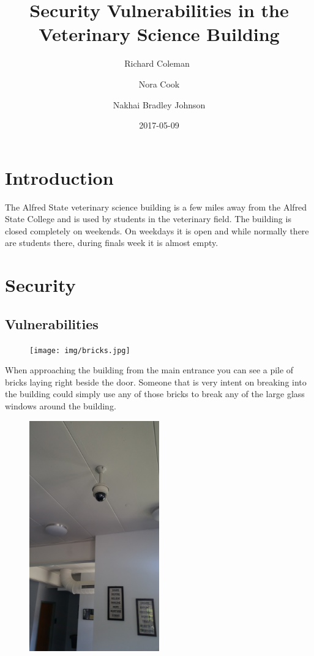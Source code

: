 \documentclass[12pt]{article}
\title{Security Vulnerabilities in the Veterinary Science Building}
\date{2017-05-09}
\author{Richard Coleman\
        \and
        Nora Cook
        \and
        Nakhai Bradley Johnson
        }
\begin{document}
        \maketitle
        \newpage
\section{Introduction}
        The Alfred State veterinary science building is a few miles away from the 
        Alfred State College and is used by students in the veterinary field. The
        building is closed completely on weekends. On weekdays it is open and while
        normally there are students there, during finals week it is almost empty.

\section{Security}
        \subsection{Vulnerabilities}
        
        \begin{figure}
        \centering
        \texttt{[image: img/bricks.jpg]}
        \end{figure}

        When approaching the building from the main entrance you can see a pile of 
        bricks laying right beside the door. Someone that is very intent on breaking
        into the building could simply use any of those bricks to break any of the 
        large glass windows around the building.
        
        \begin{figure}
        \centering
        \includegraphics[width=0.5\textwidth, angle=270]{img/camera.jpg}
        \end{figure}
\end{document}
